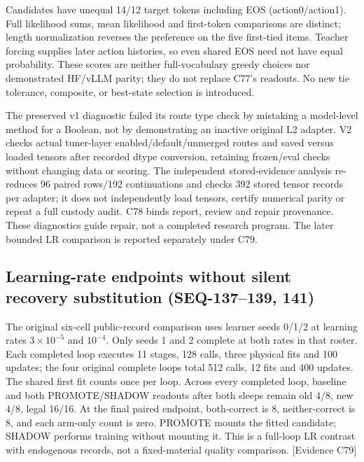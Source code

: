 \documentclass{article}
\begin{document}
Candidates have unequal 14/12 target tokens including EOS (action0/action1).
Full likelihood sums, mean likelihood and first-token comparisons are distinct;
length normalization reverses the preference on the five first-tied items.
Teacher forcing supplies later action histories, so even shared EOS need not
have equal probability. These scores are neither full-vocabulary greedy
choices nor demonstrated HF/vLLM parity; they do not replace C77's readouts.
No new tie tolerance, composite, or best-state selection is introduced.

The preserved v1 diagnostic failed its route type check by mistaking a
model-level method for a Boolean, not by demonstrating an inactive original L2
adapter. V2 checks actual tuner-layer enabled/default/unmerged routes and saved
versus loaded tensors after recorded dtype conversion, retaining frozen/eval
checks without changing data or scoring. The independent stored-evidence
analysis re-reduces 96 paired rows/192 continuations and checks 392 stored tensor
records per adapter; it does not independently load tensors, certify numerical
parity or repeat a full custody audit. C78 binds report, review and repair
provenance. These diagnostics guide repair, not a completed research program.
The later bounded LR comparison is reported separately under C79.


\subsection{Learning-rate endpoints without silent recovery substitution (SEQ-137--139, 141)}
\label{sec:bounded-lr}
The original six-cell public-record comparison uses learner seeds 0/1/2 at
learning rates $3\times10^{-5}$ and $10^{-4}$. Only seeds 1 and 2 complete at
both rates in that roster. Each completed loop executes 11 stages, 128 calls,
three physical fits and 100 updates; the four original complete loops total
512 calls, 12 fits and 400 updates. The shared first fit counts once per loop.
Across every completed loop, baseline and both PROMOTE/SHADOW readouts after
both sleeps remain old 4/8, new 4/8, legal 16/16. At the final paired endpoint,
both-correct is 8, neither-correct is 8, and each arm-only count is zero.
PROMOTE mounts the fitted candidate; SHADOW performs training without mounting
it. This is a full-loop LR contrast with endogenous records, not a fixed-material
quality comparison. \textsf{[Evidence C79]}
\end{document}
